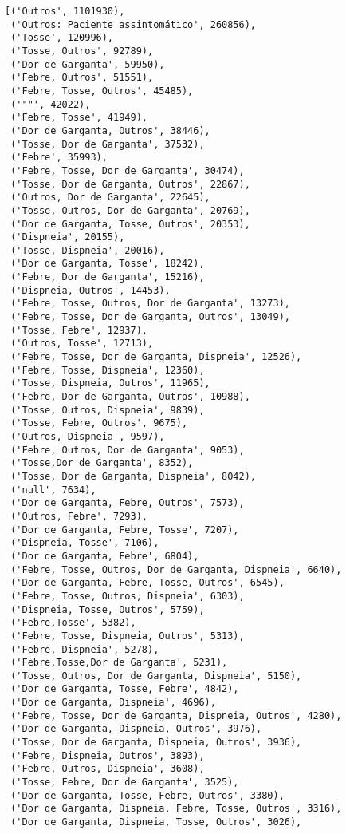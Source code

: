 \documentclass[11pt]{article}
\makeatletter
\newcommand{\boxspacing}{\kern\kvtcb@left@rule\kern\kvtcb@boxsep}
\newcommand{\prompt}[4]{
        \ttfamily\llap{{\color{#2}[#3]:\hspace{3pt}#4}}\vspace{-\baselineskip}
    }
\makeatother
\begin{document}
            \begin{tcolorbox}[breakable, size=fbox, boxrule=.5pt, pad at break*=1mm, opacityfill=0]
\prompt{Out}{outcolor}{7}{\boxspacing}
\begin{Verbatim}[commandchars=\\\{\}]
[('Outros', 1101930),
 ('Outros: Paciente assintomático', 260856),
 ('Tosse', 120996),
 ('Tosse, Outros', 92789),
 ('Dor de Garganta', 59950),
 ('Febre, Outros', 51551),
 ('Febre, Tosse, Outros', 45485),
 ('""', 42022),
 ('Febre, Tosse', 41949),
 ('Dor de Garganta, Outros', 38446),
 ('Tosse, Dor de Garganta', 37532),
 ('Febre', 35993),
 ('Febre, Tosse, Dor de Garganta', 30474),
 ('Tosse, Dor de Garganta, Outros', 22867),
 ('Outros, Dor de Garganta', 22645),
 ('Tosse, Outros, Dor de Garganta', 20769),
 ('Dor de Garganta, Tosse, Outros', 20353),
 ('Dispneia', 20155),
 ('Tosse, Dispneia', 20016),
 ('Dor de Garganta, Tosse', 18242),
 ('Febre, Dor de Garganta', 15216),
 ('Dispneia, Outros', 14453),
 ('Febre, Tosse, Outros, Dor de Garganta', 13273),
 ('Febre, Tosse, Dor de Garganta, Outros', 13049),
 ('Tosse, Febre', 12937),
 ('Outros, Tosse', 12713),
 ('Febre, Tosse, Dor de Garganta, Dispneia', 12526),
 ('Febre, Tosse, Dispneia', 12360),
 ('Tosse, Dispneia, Outros', 11965),
 ('Febre, Dor de Garganta, Outros', 10988),
 ('Tosse, Outros, Dispneia', 9839),
 ('Tosse, Febre, Outros', 9675),
 ('Outros, Dispneia', 9597),
 ('Febre, Outros, Dor de Garganta', 9053),
 ('Tosse,Dor de Garganta', 8352),
 ('Tosse, Dor de Garganta, Dispneia', 8042),
 ('null', 7634),
 ('Dor de Garganta, Febre, Outros', 7573),
 ('Outros, Febre', 7293),
 ('Dor de Garganta, Febre, Tosse', 7207),
 ('Dispneia, Tosse', 7106),
 ('Dor de Garganta, Febre', 6804),
 ('Febre, Tosse, Outros, Dor de Garganta, Dispneia', 6640),
 ('Dor de Garganta, Febre, Tosse, Outros', 6545),
 ('Febre, Tosse, Outros, Dispneia', 6303),
 ('Dispneia, Tosse, Outros', 5759),
 ('Febre,Tosse', 5382),
 ('Febre, Tosse, Dispneia, Outros', 5313),
 ('Febre, Dispneia', 5278),
 ('Febre,Tosse,Dor de Garganta', 5231),
 ('Tosse, Outros, Dor de Garganta, Dispneia', 5150),
 ('Dor de Garganta, Tosse, Febre', 4842),
 ('Dor de Garganta, Dispneia', 4696),
 ('Febre, Tosse, Dor de Garganta, Dispneia, Outros', 4280),
 ('Dor de Garganta, Dispneia, Outros', 3976),
 ('Tosse, Dor de Garganta, Dispneia, Outros', 3936),
 ('Febre, Dispneia, Outros', 3893),
 ('Febre, Outros, Dispneia', 3608),
 ('Tosse, Febre, Dor de Garganta', 3525),
 ('Dor de Garganta, Tosse, Febre, Outros', 3380),
 ('Dor de Garganta, Dispneia, Febre, Tosse, Outros', 3316),
 ('Dor de Garganta, Dispneia, Tosse, Outros', 3026),

\end{Verbatim}
\end{tcolorbox}
\end{document}
